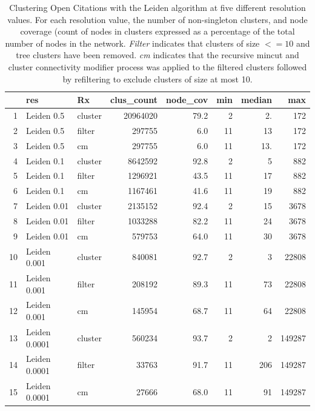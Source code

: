 \documentclass[11pt]{article}   	%
\begin{document}
\begin{table}[H]
\centering
\begin{tabular}{rllrrrrr}
  \hline
 & res & Rx & clus\_count & node\_cov & min & median & max \\ 
  \hline
1 & Leiden 0.5 & cluster & 20964020 & 79.2 &   2 & 2. & 172 \\ 
  2 & Leiden 0.5 & filter & 297755 & 6.0 &  11 & 13 & 172 \\ 
  3 & Leiden 0.5 & cm & 297755 & 6.0 &  11 & 13. & 172 \\ 
  \hline
  4 & Leiden 0.1 & cluster & 8642592 & 92.8 &   2 & 5 & 882 \\ 
  5 & Leiden 0.1 & filter & 1296921 & 43.5 &  11 & 17 & 882 \\ 
  6 & Leiden 0.1 & cm & 1167461 & 41.6 &  11 & 19 & 882 \\ 
  \hline
  7 & Leiden 0.01 & cluster & 2135152 & 92.4 &   2 & 15 & 3678 \\ 
  8 & Leiden 0.01 & filter & 1033288 & 82.2 &  11 & 24 & 3678 \\ 
  9 & Leiden 0.01 & cm & 579753 & 64.0 &  11 & 30 & 3678 \\ 
  \hline
  10 & Leiden 0.001 & cluster & 840081 & 92.7 &   2 & 3 & 22808 \\ 
  11 & Leiden 0.001 & filter & 208192 & 89.3 &  11 & 73 & 22808 \\ 
  12 & Leiden 0.001 & cm & 145954 & 68.7 &  11 & 64 & 22808 \\ 
  \hline
  13 & Leiden 0.0001 & cluster & 560234 & 93.7 &   2 & 2 & 149287 \\ 
  14 & Leiden 0.0001 & filter & 33763 & 91.7 &  11 & 206 & 149287 \\ 
  15 & Leiden 0.0001 & cm & 27666 & 68.0 &  11 & 91 & 149287 \\ 
   \hline
\end{tabular}
\caption{Clustering Open Citations with the Leiden algorithm at five different resolution values. For each resolution value, the number of non-singleton clusters, and node coverage (count of nodes in clusters expressed as a percentage of the total number of nodes in the network. \emph{Filter} indicates that clusters of size $<=10$ and tree clusters have been removed. \emph{cm} indicates that the recursive mincut and cluster connectivity modifier process was applied to the filtered clusters followed by refiltering to exclude clusters of size at most 10.}
\label{tab: cm_stats}
\end{table}
\end{document}
